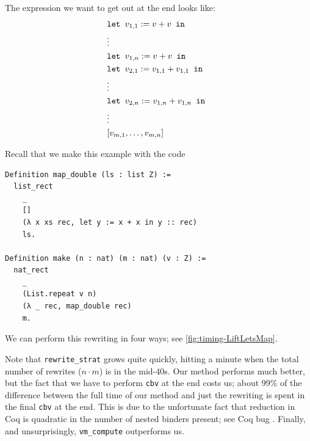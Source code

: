 \begin{subappendices}
The expression we want to get out at the end looks like:
\begin{align*}
    & \letin[{v_{1,1} := v + v}{}] \\
    & \vdots \\
    & \letin[{v_{1,n} := v + v}{}] \\
    & \letin[{v_{2,1} := v_{1,1} + v_{1,1}}{}] \\
    & \vdots \\
    & \letin[{v_{2,n} := v_{1,n} + v_{1,n}}{}] \\
    & \vdots \\
    & [v_{m,1}, \ldots, v_{m,n}]
\end{align*}

Recall that we make this example with the code
\begin{verbatim}
Definition map_double (ls : list Z) :=
  list_rect
    _
    []
    (λ x xs rec, let y := x + x in y :: rec)
    ls.

Definition make (n : nat) (m : nat) (v : Z) :=
  nat_rect
    _
    (List.repeat v n)
    (λ _ rec, map_double rec)
    m.
\end{verbatim}

We can perform this rewriting in four ways; see \autoref{fig:timing-LiftLetsMap}.

Note that \texttt{rewrite\_strat} grows quite quickly, hitting a minute when the total number of rewrites ($n \cdot m$) is in the mid-40s.
Our method performs much better, but the fact that we have to perform \texttt{cbv} at the end costs us; about 99\% of the difference between the full time of our method and just the rewriting is spent in the final \texttt{cbv} at the end.
This is due to the unfortunate fact that reduction in Coq is quadratic in the number of nested binders present; see Coq bug .
Finally, and unsurprisingly, \texttt{vm\_compute} outperforms us.


\end{subappendices}
